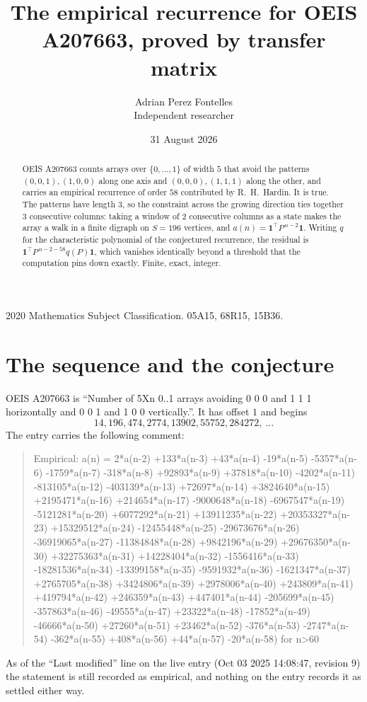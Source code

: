 \documentclass[11pt,a4paper]{article}
\title{The empirical recurrence for OEIS A207663, proved by transfer matrix}
\author{Adrian Perez Fontelles\\ \small Independent researcher}
\date{31 August 2026}
\theoremstyle{plain}
\theoremstyle{definition}
\begin{document}
\maketitle

\begin{abstract}
OEIS A207663 counts arrays over $\{0,\dots,1\}$ of width $5$ that avoid the patterns
$(0,0,1), (1,0,0)$ along one axis and $(0,0,0), (1,1,1)$ along the other, and carries an empirical recurrence of
order $58$ contributed by R.~H.~Hardin. It is true. The patterns have length $3$, so
the constraint across the growing direction ties together $3$ consecutive columns: taking a
window of $2$ consecutive columns as a state makes the array a walk in a finite digraph
on $S=196$ vertices, and $a(n)=\mathbf{1}^{\!\top}P^{\,n-2}\mathbf{1}$. Writing $q$
for the characteristic polynomial of the conjectured recurrence, the residual is
$\mathbf{1}^{\!\top}P^{\,n-2-58}q(P)\mathbf{1}$, which vanishes identically
beyond a threshold that the computation pins down exactly. Finite, exact, integer.
\end{abstract}

\noindent\small 2020 Mathematics Subject Classification. 05A15, 68R15, 15B36.\normalsize

\section{The sequence and the conjecture}

OEIS A207663 is ``Number of 5Xn 0..1 arrays avoiding 0 0 0 and 1 1 1 horizontally and 0 0 1 and 1 0 0 vertically.''. It has offset
$1$ and begins
\[
14, 196, 474, 2774, 13902, 55752, 284272,\ \dots
\]
The entry carries the following comment:
\begin{quote}\small
Empirical: a(n) = 2*a(n-2) +133*a(n-3) +43*a(n-4) -19*a(n-5) -5357*a(n-6) -1759*a(n-7) -318*a(n-8) +92893*a(n-9) +37818*a(n-10) -4202*a(n-11) -813105*a(n-12) -403139*a(n-13) +72697*a(n-14) +3824640*a(n-15) +2195471*a(n-16) +214654*a(n-17) -9000648*a(n-18) -6967547*a(n-19) -5121281*a(n-20) +6077292*a(n-21) +13911235*a(n-22) +20353327*a(n-23) +15329512*a(n-24) -12455448*a(n-25) -29673676*a(n-26) -36919065*a(n-27) -11384848*a(n-28) +9842196*a(n-29) +29676350*a(n-30) +32275363*a(n-31) +14228404*a(n-32) -1556416*a(n-33) -18281536*a(n-34) -13399158*a(n-35) -9591932*a(n-36) -1621347*a(n-37) +2765705*a(n-38) +3424806*a(n-39) +2978006*a(n-40) +243809*a(n-41) +419794*a(n-42) +246359*a(n-43) +447401*a(n-44) -205699*a(n-45) -357863*a(n-46) -49555*a(n-47) +23322*a(n-48) -17852*a(n-49) -46666*a(n-50) +27260*a(n-51) +23462*a(n-52) -376*a(n-53) -2747*a(n-54) -362*a(n-55) +408*a(n-56) +44*a(n-57) -20*a(n-58) for n>60
\end{quote}
As of the ``Last modified'' line on the live entry (Oct 03 2025 14:08:47, revision
9) the statement is still recorded as empirical, and nothing on the entry
records it as settled either way.
\end{document}

